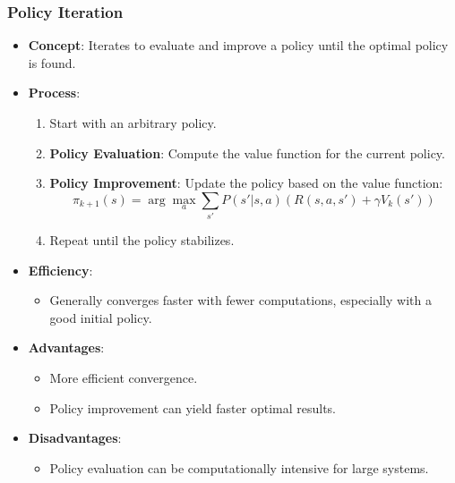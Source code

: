 \documentclass[aspectratio=169]{beamer}
\begin{document}
\begin{frame}[fragile]
    \frametitle{Policy Iteration}
    \begin{itemize}
        \item \textbf{Concept}: Iterates to evaluate and improve a policy until the optimal policy is found.
        \item \textbf{Process}:
            \begin{enumerate}
                \item Start with an arbitrary policy.
                \item \textbf{Policy Evaluation}: Compute the value function for the current policy.
                \item \textbf{Policy Improvement}: Update the policy based on the value function:
                    \begin{equation}
                    \pi_{k+1}(s) = \arg\max_a \sum_{s'} P(s' | s, a) \left( R(s, a, s') + \gamma V_k(s') \right)
                    \end{equation}
                \item Repeat until the policy stabilizes.
            \end{enumerate}
        \item \textbf{Efficiency}:
            \begin{itemize}
                \item Generally converges faster with fewer computations, especially with a good initial policy.
            \end{itemize}
        \item \textbf{Advantages}:
            \begin{itemize}
                \item More efficient convergence.
                \item Policy improvement can yield faster optimal results.
            \end{itemize}
        \item \textbf{Disadvantages}:
            \begin{itemize}
                \item Policy evaluation can be computationally intensive for large systems.
            \end{itemize}
    \end{itemize}
\end{frame}
\end{document}
